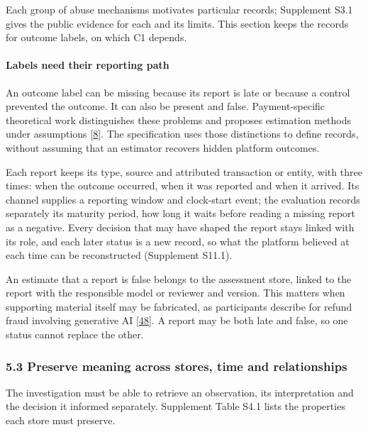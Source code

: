\documentclass[
  11pt,
]{article}
\begin{document}
Each group of abuse mechanisms motivates particular records; Supplement
S3.1 gives the public evidence for each and its limits. This section
keeps the records for outcome labels, on which C1 depends.

\hypertarget{labels-need-their-reporting-path}{%
\paragraph{Labels need their reporting
path}\label{labels-need-their-reporting-path}}

An outcome label can be missing because its report is late or because a
control prevented the outcome. It can also be present and false.
Payment-specific theoretical work distinguishes these problems and
proposes estimation methods under assumptions
{[}\protect\hyperlink{ref-Dhama2026Causal}{8}{]}. The specification uses
those distinctions to define records, without assuming that an estimator
recovers hidden platform outcomes.

Each report keeps its type, source and attributed transaction or entity,
with three times: when the outcome occurred, when it was reported and
when it arrived. Its channel supplies a reporting window and clock-start
event; the evaluation records separately its maturity period, how long
it waits before reading a missing report as a negative. Every decision
that may have shaped the report stays linked with its role, and each
later status is a new record, so what the platform believed at each time
can be reconstructed (Supplement S11.1).

An estimate that a report is false belongs to the assessment store,
linked to the report with the responsible model or reviewer and version.
This matters when supporting material itself may be fabricated, as
participants describe for refund fraud involving generative AI
{[}\protect\hyperlink{ref-Zhang2026Refund}{48}{]}. A report may be both
late and false, so one status cannot replace the other.

\hypertarget{preserve-meaning-across-stores-time-and-relationships}{%
\subsubsection{5.3 Preserve meaning across stores, time and
relationships}\label{preserve-meaning-across-stores-time-and-relationships}}

The investigation must be able to retrieve an observation, its
interpretation and the decision it informed separately. Supplement Table
S4.1 lists the properties each store must preserve.
\end{document}
